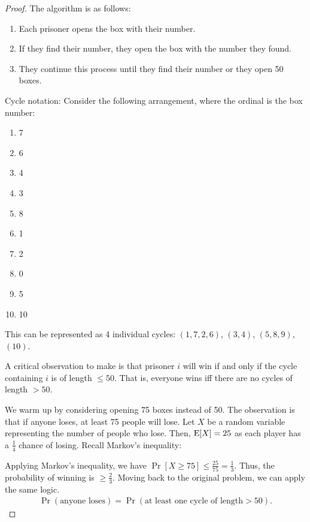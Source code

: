 \documentclass{report}
\begin{document}
\begin{proof}
\noindent The algorithm is as follows:
\begin{enumerate}
    \item Each prisoner opens the box with their number.
    \item If they find their number, they open the box with the number they found.
    \item They continue this process until they find their number or they open 50 boxes.
\end{enumerate}

\noindent Cycle notation: Consider the following arrangement, where the ordinal is the box number:
\begin{enumerate}
    \item 7
    \item 6
    \item 4
    \item 3
    \item 8
    \item 1
    \item 2
    \item 0
    \item 5
    \item 10
\end{enumerate}
\noindent This can be represented as 4 individual cycles: $(1, 7, 2, 6)$, $(3, 4)$, $(5, 8, 9)$, $(10)$.

A critical observation to make is that prisoner $i$ will win if and only if the cycle containing $i$ is of length $\leq 50$. That is, everyone wins iff there are no cycles of length $> 50$.

We warm up by considering opening 75 boxes instead of 50. The observation is that if anyone loses, at least 75 people will lose. Let $X$ be a random variable representing the number of people who lose. Then, $\operatorname{E}[X] = 25$ as each player has a $\frac{1}{4}$ chance of losing. Recall Markov's inequality:

\noindent Applying Markov's inequality, we have $\Pr[X \geq 75] \leq \frac{25}{75} = \frac{1}{3}$. Thus, the probability of winning is $\geq \frac{2}{3}$. Moving back to the original problem, we can apply the same logic.
\begin{align*}
    \Pr(\text{anyone loses}) = \Pr(\text{at least one cycle of length} > 50).
\end{align*}


\end{proof}
\end{document}
